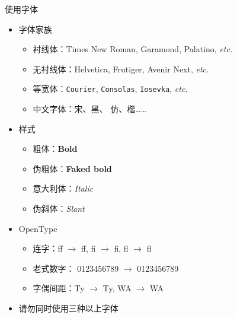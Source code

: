 \begin{frame}{使用字体}
\begin{itemize}
  \item 字体家族
    \begin{itemize}
      \item 衬线体：Times New Roman, Garamond, Palatino, \emph{etc.}
      \item 无衬线体：{Helvetica}, {Frutiger}, {Avenir Next}, \emph{etc.}
      \item 等宽体：\texttt{Courier}, \texttt{Consolas}, \texttt{Iosevka}, \emph{etc.}
      \item 中文字体：宋、{黑}、
        {仿}、{楷}……
    \end{itemize}
  \item 样式
    \begin{itemize}
      \item 粗体：\textbf{Bold}
      \item 伪粗体：{\textbf{Faked bold}}
      \item 意大利体：\textit{Italic}
      \item 伪斜体：{\textsl{Slant}}
    \end{itemize}
  \item OpenType
    \begin{itemize}
      \item 连字：{f}{f} $\to$ ff, {f}{i} $\to$ fi, {f}{l} $\to$ fl
      \item 老式数字：
        0123456789 $\to$ {0123456789}
      \item 字偶间距：{T}{y} $\to$ Ty, {W}{A} $\to$ WA
    \end{itemize}
  \item \alert{请勿同时使用三种以上字体}
\end{itemize}
\end{frame}
